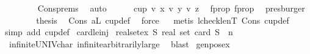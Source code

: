 \begin{isabellebody}
\ \ \ \ \ \ \isamarkupfalse%
\ Cons{\isachardot}{\kern0pt}prems\ \isamarkupfalse%
\ auto\isanewline
\ \ \ \ \isamarkupfalse%
\ {\isachardoublequoteopen}cup{}\ {\isacharparenleft}{\kern0pt}v{}\ x{\isacharparenright}{\kern0pt}\ {\isacharparenleft}{\kern0pt}v{}\ y{\isacharparenright}{\kern0pt}\ {\isacharparenleft}{\kern0pt}v{}\ z{\isacharparenright}{\kern0pt}{\isachardoublequoteclose}\ \isamarkupfalse%
\ f{\isacharunderscore}{\kern0pt}prop{}\ f{\isacharunderscore}{\kern0pt}prop{}{}\ \isamarkupfalse%
\ presburger\isanewline
\ \ \ \ \isamarkupfalse%
\ \isamarkupfalse%
\ {\isacharquery}{\kern0pt}thesis\ \isamarkupfalse%
\ Cons\ aL\ cup{\isacharunderscore}{\kern0pt}def\ \isamarkupfalse%
\ force\isanewline
\ \ \isamarkupfalse%
{\isacharparenleft}{\kern0pt}metis\ lcheck{\isacharunderscore}{\kern0pt}len{}{\isacharunderscore}{\kern0pt}T\ Cons{\isacharparenleft}{\kern0pt}{}{\isacharparenright}{\kern0pt}\ cup{\isacharunderscore}{\kern0pt}def{\isacharparenright}{\kern0pt}\isanewline
{}\isamarkupfalse%
{\isacharparenleft}{\kern0pt}simp\ add{\isacharcolon}{\kern0pt}\ cup{\isacharunderscore}{\kern0pt}def{\isacharparenright}{\kern0pt}%
\endisatagproof
{\isafoldproof}%
%
\isadelimproof
\isanewline
%
\endisadelimproof
\isanewline
{}\isamarkupfalse%
\ card{\isacharunderscore}{\kern0pt}le{\isacharunderscore}{\kern0pt}inj\isanewline
\isanewline
{}\isamarkupfalse%
\ real{\isacharunderscore}{\kern0pt}set{\isacharunderscore}{\kern0pt}ex{\isacharcolon}{\kern0pt}\ {\isachardoublequoteopen}{\isasymexists}{\isacharparenleft}{\kern0pt}S{\isacharcolon}{\kern0pt}{\isacharcolon}{\kern0pt}\ real\ set{\isacharparenright}{\kern0pt}{\isachardot}{\kern0pt}\ card\ S\ {\isacharequal}{\kern0pt}\ n{\isachardoublequoteclose}\isanewline
%
\isadelimproof
\ \ %
\endisadelimproof
%
\isatagproof
{}\isamarkupfalse%
\ infinite{\isacharunderscore}{\kern0pt}UNIV{\isacharunderscore}{\kern0pt}char{\isacharunderscore}{\kern0pt}{}\ infinite{\isacharunderscore}{\kern0pt}arbitrarily{\isacharunderscore}{\kern0pt}large\ \isamarkupfalse%
\ blast%
\endisatagproof
{\isafoldproof}%
%
\isadelimproof
\isanewline
%
\endisadelimproof
\isanewline
{}\isamarkupfalse%
\ genpos{\isacharunderscore}{\kern0pt}ex{\isacharcolon}{\kern0pt}\isanewline

\end{isabellebody}
